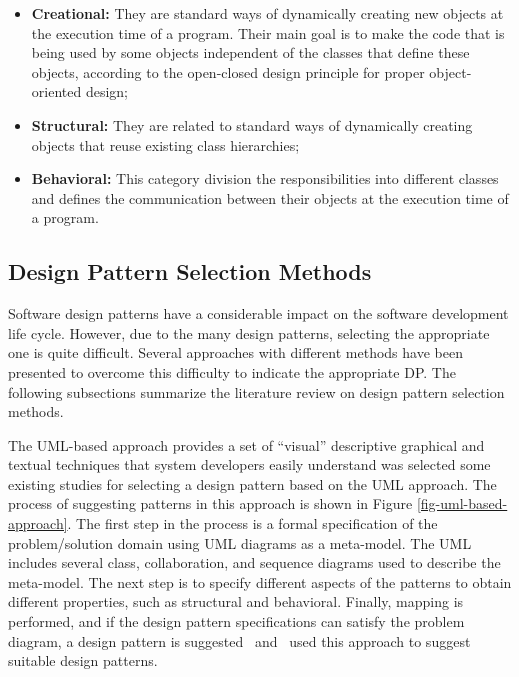 \begin{itemize}
\item \textbf{Creational:} They are standard ways of dynamically creating new objects at the execution time of a program. Their main goal is to make the code that is being used by some objects independent of the classes that define these objects, according to the open-closed design principle for proper object-oriented design;

\item \textbf{Structural:} They are related to standard ways of dynamically creating objects that reuse existing class hierarchies;

\item \textbf{Behavioral:} This category division the responsibilities into different classes and defines the communication between their objects at the execution time of a program.
\end{itemize}

\subsection{Design Pattern Selection Methods} \label{sec:pattern:selection-methods}
Software design patterns have a considerable impact on the software development life cycle. However, due to the many design patterns, selecting the appropriate one is quite difficult. Several approaches with different methods have been presented to overcome this difficulty to indicate the appropriate \ac{DP}. The following subsections summarize the literature review on design pattern selection methods.

\label{subsec:uml-approach}

The UML-based approach provides a set of ``visual'' descriptive graphical and textual techniques that system developers easily understand was selected some existing studies for selecting a design pattern based on the UML approach. The process of suggesting patterns in this approach is shown in Figure \ref{fig-uml-based-approach}. The first step in the process is a formal specification of the problem/solution domain using UML diagrams as a meta-model. The UML includes several class, collaboration, and sequence diagrams used to describe the meta-model. The next step is to specify different aspects of the patterns to obtain different properties, such as structural and behavioral. Finally, mapping is performed, and if the design pattern specifications can satisfy the problem diagram, a design pattern is suggested~\textcite {Hsueh2009} and~\textcite{Kim2007, Kim2008} used this approach to suggest suitable design patterns.

